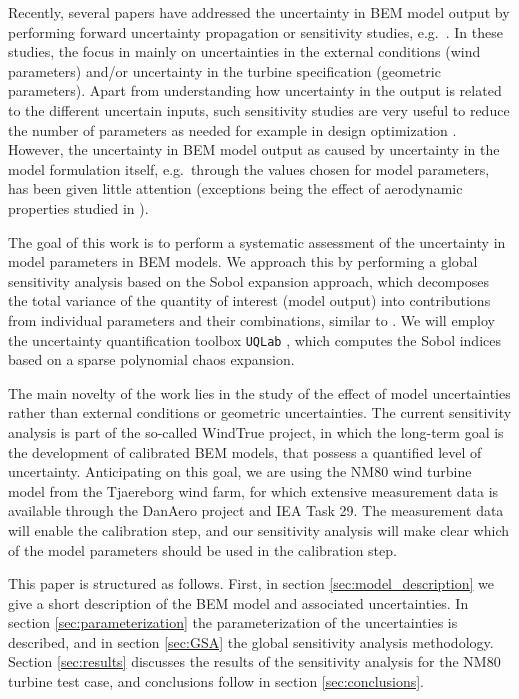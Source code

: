 \documentclass[review]{elsarticle}
\numberwithin{equation}{section}
\numberwithin{equation}{section}
\begin{document}
Recently, several papers have addressed the uncertainty in BEM model output by performing forward uncertainty propagation or sensitivity studies, e.g.\ \cite{Echeverria2017,Matthaus2017,Murcia2018,Robertson2018,Bos2019a}. In these studies, the focus in mainly on uncertainties in the external conditions (wind parameters) and/or uncertainty in the turbine specification (geometric parameters). Apart from understanding how uncertainty in the output is related to the different uncertain inputs, such sensitivity studies are very useful to reduce the number of parameters as needed for example in design optimization \cite{Echeverria2017}. However, the uncertainty in BEM model output as caused by uncertainty in the model formulation itself, e.g.\ through the values chosen for model parameters, has been given little attention (exceptions being the effect of aerodynamic properties studied in \cite{Bortolotti2019,Matthaus2017}).

The goal of this work is to perform a systematic assessment of the uncertainty in model parameters in BEM models. We approach this by performing a global sensitivity analysis based on the Sobol expansion approach, which decomposes the total variance of the quantity of interest (model output) into contributions from individual parameters and their combinations, similar to \cite{Echeverria2017,Murcia2018,Rinker2016}. We will employ the uncertainty quantification toolbox \texttt{UQLab} \cite{uqlab}, which computes the Sobol indices based on a sparse polynomial chaos expansion. 

The main novelty of the work lies in the study of the effect of model uncertainties rather than external conditions or geometric uncertainties. The current sensitivity analysis is part of the so-called WindTrue project, in which the long-term goal is the development of calibrated BEM models, that possess a quantified level of uncertainty. Anticipating on this goal, we are using the NM80 wind turbine model from the Tjaereborg wind farm, for which extensive measurement data is available through the DanAero project \cite{Troldborg2013} and IEA Task 29. The measurement data will enable the calibration step, and our sensitivity analysis will make clear which of the model parameters should be used in the calibration step.

This paper is structured as follows. First, in section \ref{sec:model_description} we give a short description of the BEM model and associated uncertainties. In section \ref{sec:parameterization} the parameterization of the uncertainties is described, and in section \ref{sec:GSA} the global sensitivity analysis methodology. Section \ref{sec:results} discusses the results of the sensitivity analysis for the NM80 turbine test case, and conclusions follow in section \ref{sec:conclusions}.
\end{document}
